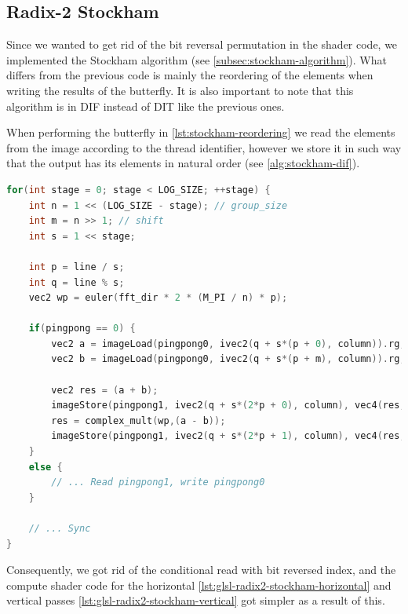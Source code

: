 \documentclass[
  oneside,
  11pt, a4paper,
  footinclude=true,
  headinclude=true,
  cleardoublepage=empty
]{scrbook}
\begin{document}

\subsection{Radix-2 Stockham} \label{subsec:radix2-stockham}

Since we wanted to get rid of the bit reversal permutation in the shader code, we implemented the Stockham algorithm (see \autoref{subsec:stockham-algorithm}). What differs from the previous code is mainly the reordering of the elements when writing the results of the butterfly. It is also important to note that this algorithm is in DIF instead of DIT like the previous ones.
\newline


When performing the butterfly in \autoref{lst:stockham-reordering}  we read the elements from the image according to the thread identifier, however we store it in such way that the output has its elements in natural order (see \autoref{alg:stockham-dif}).

\begin{lstlisting}[language=C, caption={Radix-2 Stockham DIF}, label={lst:stockham-reordering}]
for(int stage = 0; stage < LOG_SIZE; ++stage) {
    int n = 1 << (LOG_SIZE - stage); // group_size
    int m = n >> 1; // shift
    int s = 1 << stage;

    int p = line / s;
    int q = line % s;
    vec2 wp = euler(fft_dir * 2 * (M_PI / n) * p);
    
    if(pingpong == 0) {
        vec2 a = imageLoad(pingpong0, ivec2(q + s*(p + 0), column)).rg;
        vec2 b = imageLoad(pingpong0, ivec2(q + s*(p + m), column)).rg;

        vec2 res = (a + b);
        imageStore(pingpong1, ivec2(q + s*(2*p + 0), column), vec4(res,0,0));
        res = complex_mult(wp,(a - b));
        imageStore(pingpong1, ivec2(q + s*(2*p + 1), column), vec4(res,0,0));
    }
    else {
        // ... Read pingpong1, write pingpong0
    }
    
    // ... Sync
}
\end{lstlisting}

Consequently, we got rid of the conditional read with bit reversed index, and the compute shader code for the horizontal \autoref{lst:glsl-radix2-stockham-horizontal} and vertical passes \autoref{lst:glsl-radix2-stockham-vertical} got simpler as a result of this.
\end{document}
